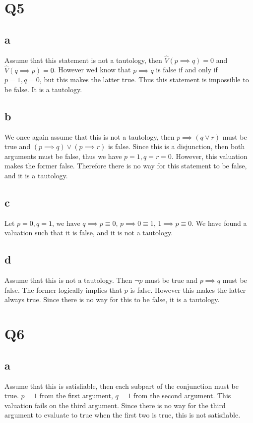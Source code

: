 \documentclass[12pt]{article}
\begin{document}
\section{Q5}
\subsection{a}
Assume that this statement is not a tautology, then $\hat{V}(p \implies q)=0$ and $\hat{V}(q \implies p) = 0$.
However we4 know that $p \implies q$ is false if and only if $p = 1, q = 0$, but this makes the latter true. Thus 
this statement is impossible to be false. It is a tautology.

\subsection{b}
We once again assume that this is not a tautology, then $p \implies (q \lor r)$ must be true and 
$(p \implies q) \lor (p \implies r)$ is false. Since this is a disjunction, then both 
arguments must be false, thus we have $p = 1, q = r = 0$. However, this valuation makes 
the former false. Therefore there is no way for this statement to be false, and it is a tautology.

\subsection{c}
Let $p = 0, q = 1$, we have $q \implies p \equiv 0$, $p \implies 0 \equiv 1$, $1 \implies p \equiv 0$. 
We have found a valuation such that it is false, and it is not a tautology.

\subsection{d}
Assume that this is not a tautology. Then $\neg p$ must be true and $p \implies q$ must be false. 
The former logically implies that $p$ is false. However this makes the latter always true. 
Since there is no way for this to be false, it is a tautology.


\section{Q6}
\subsection{a}
Assume that this is satisfiable, then each subpart of the conjunction must be true.
$p = 1$ from the first argument, $q = 1$ from the second argument. This valuation fails 
on the third argument. Since there is no way for the third argument to evaluate to true 
when the first two is true, this is not satisfiable.
\end{document}
